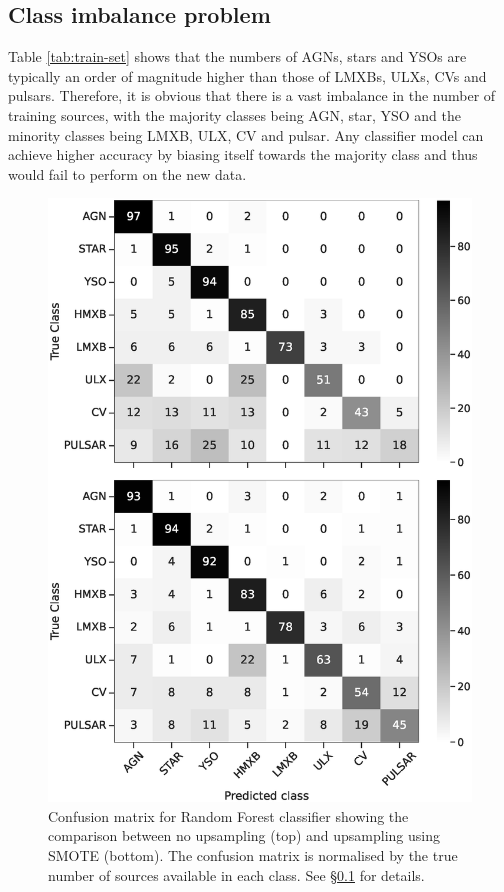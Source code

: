 \documentclass[fleqn,usenatbib]{mnras}
\begin{document}
    \subsection{Class imbalance problem}\label{sec:class-imbalance}
         Table \ref{tab:train-set} shows that the numbers of AGNs, stars and YSOs are typically an order of magnitude higher than those of LMXBs, ULXs, CVs and pulsars. Therefore, it is obvious that there is a vast imbalance in the number of training sources, with the majority classes being AGN, star, YSO and the minority classes being LMXB, ULX, CV and pulsar. Any classifier model can achieve higher accuracy by biasing itself towards the majority class and thus would fail to perform on the new data. 
       \begin{figure}
            \centering
            \includegraphics[width=\columnwidth]{images/cf_smote_comp.eps}
            \caption{Confusion matrix for Random Forest classifier showing the comparison between no upsampling (top) and upsampling using SMOTE (bottom). The confusion matrix is normalised by the true number of sources available in each class. See \S \ref{sec:class-imbalance} for details.}
            \label{fig:smote-comp}
        \end{figure}
        
\end{document}
